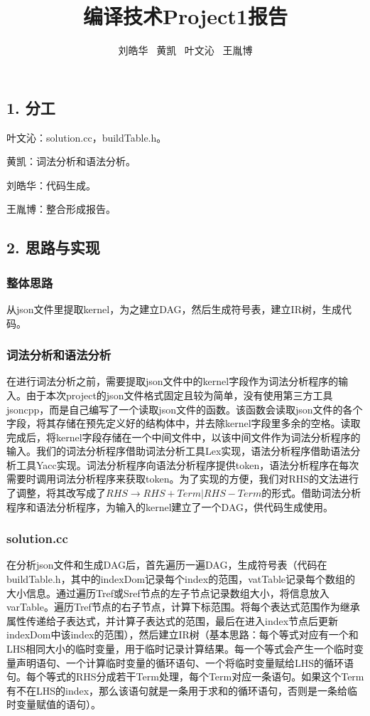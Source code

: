 \documentclass[a4paper,11pt]{ctexart}
\title{编译技术Project1报告}
\author{刘皓华 ~黄凯 ~叶文沁 ~王胤博}
\date{ }
\begin{document}
\maketitle
\subsection*{1. 分工}
叶文沁：solution.cc，buildTable.h。

黄凯：词法分析和语法分析。

刘皓华：代码生成。

王胤博：整合形成报告。
\subsection*{2. 思路与实现}
\subsubsection*{整体思路}

从json文件里提取kernel，为之建立DAG，然后生成符号表，建立IR树，生成代码。

\subsubsection*{词法分析和语法分析}

在进行词法分析之前，需要提取json文件中的kernel字段作为词法分析程序的输入。由于本次project的json文件格式固定且较为简单，没有使用第三方工具jsoncpp，而是自己编写了一个读取json文件的函数。该函数会读取json文件的各个字段，将其存储在预先定义好的结构体中，并去除kernel字段里多余的空格。读取完成后，将kernel字段存储在一个中间文件中，以该中间文件作为词法分析程序的输入。我们的词法分析程序借助词法分析工具Lex实现，语法分析程序借助语法分析工具Yacc实现。词法分析程序向语法分析程序提供token，语法分析程序在每次需要时调用词法分析程序来获取token。为了实现的方便，我们对RHS的文法进行了调整，将其改写成了$RHS\rightarrow RHS+Term|RHS-Term$的形式。借助词法分析程序和语法分析程序，为输入的kernel建立了一个DAG，供代码生成使用。

\subsubsection*{solution.cc}

在分析json文件和生成DAG后，首先遍历一遍DAG，生成符号表（代码在buildTable.h，其中的indexDom记录每个index的范围，vatTable记录每个数组的大小信息。通过遍历Tref或Sref节点的左子节点记录数组大小，将信息放入varTable。遍历Tref节点的右子节点，计算下标范围。将每个表达式范围作为继承属性传递给子表达式，并计算子表达式的范围，最后在进入index节点后更新indexDom中该index的范围），然后建立IR树（基本思路：每个等式对应有一个和LHS相同大小的临时变量，用于临时记录计算结果。每一个等式会产生一个临时变量声明语句、一个计算临时变量的循环语句、一个将临时变量赋给LHS的循环语句。每个等式的RHS分成若干Term处理，每个Term对应一条语句。如果这个Term有不在LHS的index，那么该语句就是一条用于求和的循环语句，否则是一条给临时变量赋值的语句）。
\end{document}
